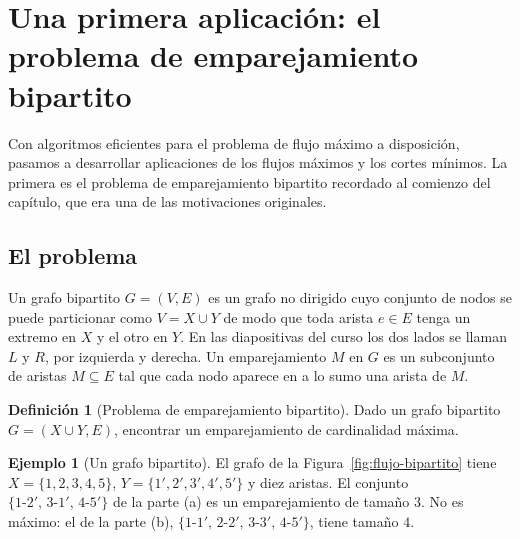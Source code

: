 \documentclass[12pt, spanish, oneside, openany]{book}
\theoremstyle{uprightplain}
\theoremstyle{definition}
\newtheorem{definicion}[teorema]{Definición}
\newtheorem{ejemplo}[teorema]{Ejemplo}
\theoremstyle{remark}
\theoremstyle{definition}
\begin{document}
\section{Una primera aplicación: el problema de emparejamiento bipartito}
\label{sec:flujo-emparejamiento}

Con algoritmos eficientes para el problema de flujo máximo a disposición, pasamos a desarrollar aplicaciones de los flujos máximos y los cortes mínimos. La primera es el problema de emparejamiento bipartito recordado al comienzo del capítulo, que era una de las motivaciones originales.

\subsection{El problema}

Un grafo bipartito $G=(V,E)$ es un grafo no dirigido cuyo conjunto de nodos se puede particionar como $V=X\cup Y$ de modo que toda arista $e\in E$ tenga un extremo en $X$ y el otro en $Y$. En las diapositivas del curso los dos lados se llaman $L$ y $R$, por izquierda y derecha. Un emparejamiento $M$ en $G$ es un subconjunto de aristas $M\subseteq E$ tal que cada nodo aparece en a lo sumo una arista de $M$.

\begin{definicion}[Problema de emparejamiento bipartito]
\label{def:flujo-emparejamiento-bipartito}
Dado un grafo bipartito $G=(X\cup Y,E)$, encontrar un emparejamiento de cardinalidad máxima.
\end{definicion}

\begin{ejemplo}[Un grafo bipartito]
\label{ej:flujo-bipartito}
El grafo de la Figura~\ref{fig:flujo-bipartito} tiene $X=\{1,2,3,4,5\}$, $Y=\{1',2',3',4',5'\}$ y diez aristas. El conjunto $\{1\text{-}2',\,3\text{-}1',\,4\text{-}5'\}$ de la parte (a) es un emparejamiento de tamaño $3$. No es máximo: el de la parte (b), $\{1\text{-}1',\,2\text{-}2',\,3\text{-}3',\,4\text{-}5'\}$, tiene tamaño $4$. 
\end{ejemplo}
\end{document}

